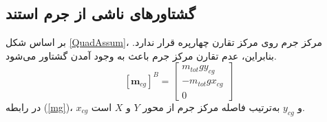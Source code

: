 \subsection{گشتاورهای ناشی از جرم استند}\label{sec:mgmoent}
بر اساس شکل
\ref{QuadAssum}،
مرکز جرم روی مرکز تقارن چهارپره قرار ندارد. بنابراین، عدم تقارن مرکز جرم باعث به وجود آمدن گشتاور می‌شود.
\begin{equation}\label{mg}
	[\boldsymbol m_ {cg}]^B = \begin{bmatrix}
		m_{tot}gy_{cg} \\
		-m_{tot}gx_{cg} \\
		0
	\end{bmatrix}
\end{equation}
در رابطه
(\ref{mg})،
$x_{cg}$
و
$y_{cg}$
به‌ترتیب فاصله مرکز جرم از محور $Y$ و $X$ است.
